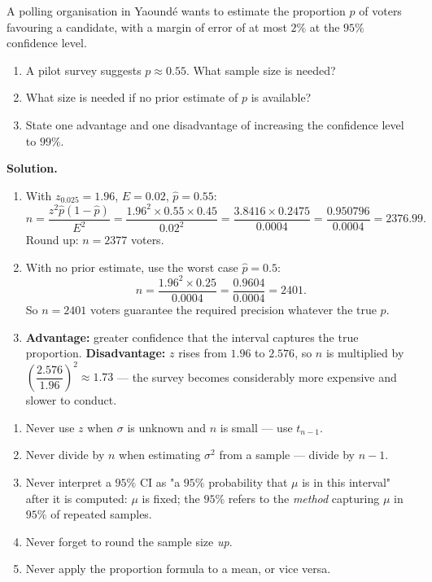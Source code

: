 \documentclass[11pt]{article}
\begin{document}
\begin{exoresolu}
A polling organisation in Yaoundé wants to estimate the proportion $p$ of voters favouring a candidate, with a margin of error of at most $2\%$ at the $95\%$ confidence level.
\begin{enumerate}
\item A pilot survey suggests $p\approx 0.55$. What sample size is needed?
\item What size is needed if no prior estimate of $p$ is available?
\item State one advantage and one disadvantage of increasing the confidence level to $99\%$.
\end{enumerate}
\tcblower
\textbf{Solution.}
\begin{enumerate}
\item With $z_{0.025}=1.96$, $E=0.02$, $\hat p = 0.55$:
\[
n=\frac{z^{2}\hat p(1-\hat p)}{E^{2}}
=\frac{1.96^{2}\times0.55\times0.45}{0.02^{2}}
=\frac{3.8416\times0.2475}{0.0004}
=\frac{0.950796}{0.0004}=2376.99.
\]
Round up: $\boxed{n=2377}$ voters.
\item With no prior estimate, use the worst case $\hat p = 0.5$:
\[
n=\frac{1.96^{2}\times0.25}{0.0004}=\frac{0.9604}{0.0004}=2401.
\]
So $\boxed{n=2401}$ voters guarantee the required precision whatever the true $p$.
\item \textbf{Advantage:} greater confidence that the interval captures the true proportion. \textbf{Disadvantage:} $z$ rises from $1.96$ to $2.576$, so $n$ is multiplied by $\left(\dfrac{2.576}{1.96}\right)^2\approx 1.73$ — the survey becomes considerably more expensive and slower to conduct.
\end{enumerate}
\end{exoresolu}

\begin{methode}
\begin{enumerate}
\item Never use $z$ when $\sigma$ is unknown and $n$ is small — use $t_{n-1}$.
\item Never divide by $n$ when estimating $\sigma^2$ from a sample — divide by $n-1$.
\item Never interpret a $95\%$ CI as "a $95\%$ probability that $\mu$ is in this interval" after it is computed: $\mu$ is fixed; the $95\%$ refers to the \emph{method} capturing $\mu$ in $95\%$ of repeated samples.
\item Never forget to round the sample size \emph{up}.
\item Never apply the proportion formula to a mean, or vice versa.
\end{enumerate}
\end{methode}
\end{document}
